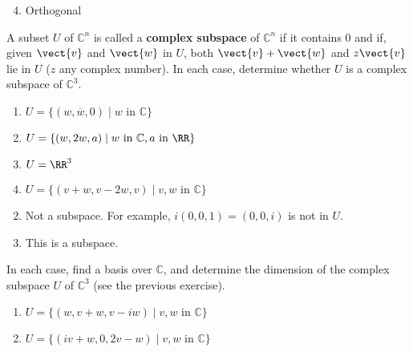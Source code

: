 \begin{multicols}{2}
\begin{ex}
\begin{sol}
\begin{enumerate}[label={\alph*.}]
\setcounter{enumi}{3}
\item  Orthogonal

\end{enumerate}
\end{sol}
\end{ex}

\begin{ex}
A subset $U$ of $\mathbb{C}^n$ is called a \textbf{complex subspace} of $\mathbb{C}^n$ if it contains $0$ and if, given $\vect{v}$ and $\vect{w}$ in $U$, both $\vect{v} + \vect{w}$ and $z\vect{v}$ lie in $U$ ($z$ any complex number). In each case, determine whether $U$ is a complex subspace of $\mathbb{C}^3$.


\begin{enumerate}[label={\alph*.}]
\item $U = \{(w, \overline{w}, 0) \mid w \mbox{ in } \mathbb{C}\}$

\item $U = \{(w, 2w, a) \mid w \mbox{ in } \mathbb{C}, a \mbox{ in } \RR\}$

\item $U = \RR^3$

\item $U = \{(v + w, v - 2w, v) \mid v, w \mbox{ in } \mathbb{C}\}$

\end{enumerate}
\begin{sol}
\begin{enumerate}[label={\alph*.}]
\setcounter{enumi}{1}
\item  Not a subspace. For example, $i(0, 0, 1) = (0, 0, i)$ is not in $U$.

\setcounter{enumi}{3}
\item  This is a subspace.

\end{enumerate}
\end{sol}
\end{ex}

\begin{ex}
In each case, find a basis over $\mathbb{C}$, and determine the dimension of the complex subspace $U$ of $\mathbb{C}^3$ (see the previous exercise).


\begin{enumerate}[label={\alph*.}]
\item $U = \{(w, v + w, v - iw) \mid v, w \mbox{ in } \mathbb{C}\}$

\item $U = \{(iv + w, 0, 2v - w) \mid v, w \mbox{ in } \mathbb{C}\}$


\end{enumerate}
\end{ex}
\end{multicols}
